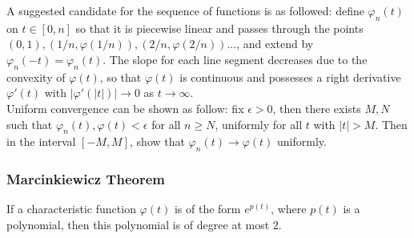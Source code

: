 \begin{unexaminable}
\begin{hint}
A suggested candidate for the sequence of functions is as followed: define $\varphi_n(t)$ on $t \in [0,n]$ so that it is piecewise linear and passes through the points $(0,1), (1/n, \varphi(1/n)), (2/n, \varphi(2/n))...$, and extend by $\varphi_n(-t) = \varphi_n(t)$. The slope for each line segment decreases due to the convexity of $\varphi(t)$, so that $\varphi(t)$ is continuous and possesses a right derivative $\varphi'(t)$ with $|\varphi'(|t|)| \to 0$ as $t \to \infty$.\\

Uniform convergence can be shown as follow: fix $\epsilon > 0$, then there exists $M,N$ such that $\varphi_n(t), \varphi(t) < \epsilon$ for all $n \geq N$, uniformly for all $t$ with $|t|>M$. Then in the interval $[-M,M]$, show that $\varphi_n(t) \to \varphi(t)$ uniformly.
\end{hint}
\end{unexaminable}




\subsubsection{Marcinkiewicz Theorem}
\begin{theorem} \label{thm:Marcinkiewicz}
If a characteristic function $\varphi(t)$ is of the form $e^{p(t)}$, where $p(t)$ is a polynomial, then this polynomial is of degree at most $2$.
\end{theorem}

